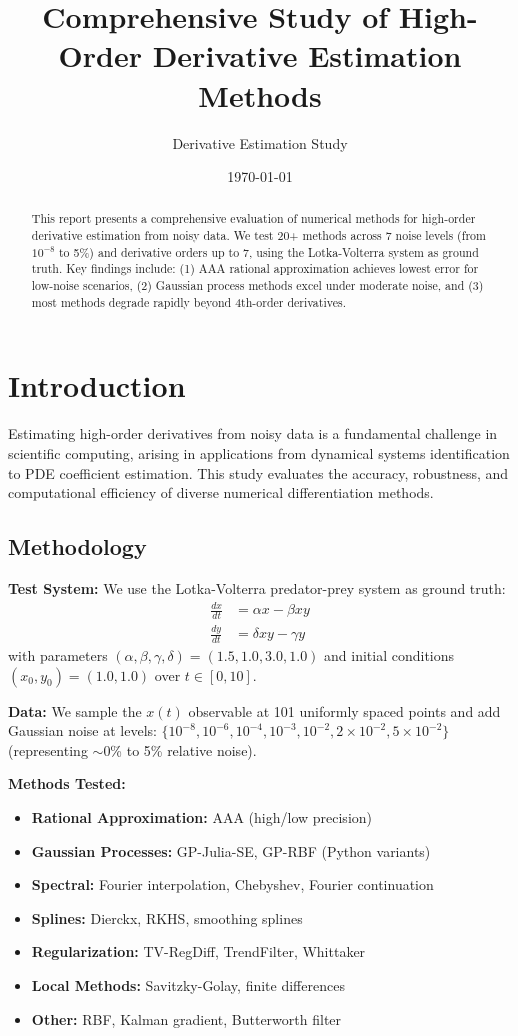 \documentclass[11pt]{article}
\title{Comprehensive Study of High-Order Derivative Estimation Methods}
\author{Derivative Estimation Study}
\date{\today}
\begin{document}
\maketitle

\begin{abstract}
This report presents a comprehensive evaluation of numerical methods for high-order derivative estimation from noisy data. We test 20+ methods across 7 noise levels (from $10^{-8}$ to 5\%) and derivative orders up to 7, using the Lotka-Volterra system as ground truth. Key findings include: (1) AAA rational approximation achieves lowest error for low-noise scenarios, (2) Gaussian process methods excel under moderate noise, and (3) most methods degrade rapidly beyond 4th-order derivatives.
\end{abstract}

\section{Introduction}

Estimating high-order derivatives from noisy data is a fundamental challenge in scientific computing, arising in applications from dynamical systems identification to PDE coefficient estimation. This study evaluates the accuracy, robustness, and computational efficiency of diverse numerical differentiation methods.

\subsection{Methodology}

\textbf{Test System:} We use the Lotka-Volterra predator-prey system as ground truth:
\begin{align}
\frac{dx}{dt} &= \alpha x - \beta xy \\
\frac{dy}{dt} &= \delta xy - \gamma y
\end{align}
with parameters $(\alpha, \beta, \gamma, \delta) = (1.5, 1.0, 3.0, 1.0)$ and initial conditions $(x_0, y_0) = (1.0, 1.0)$ over $t \in [0, 10]$.

\textbf{Data:} We sample the $x(t)$ observable at 101 uniformly spaced points and add Gaussian noise at levels: $\{10^{-8}, 10^{-6}, 10^{-4}, 10^{-3}, 10^{-2}, 2 \times 10^{-2}, 5 \times 10^{-2}\}$ (representing $\sim$0\% to 5\% relative noise).

\textbf{Methods Tested:}
\begin{itemize}
    \item \textbf{Rational Approximation:} AAA (high/low precision)
    \item \textbf{Gaussian Processes:} GP-Julia-SE, GP-RBF (Python variants)
    \item \textbf{Spectral:} Fourier interpolation, Chebyshev, Fourier continuation
    \item \textbf{Splines:} Dierckx, RKHS, smoothing splines
    \item \textbf{Regularization:} TV-RegDiff, TrendFilter, Whittaker
    \item \textbf{Local Methods:} Savitzky-Golay, finite differences
    \item \textbf{Other:} RBF, Kalman gradient, Butterworth filter
\end{itemize}
\end{document}
